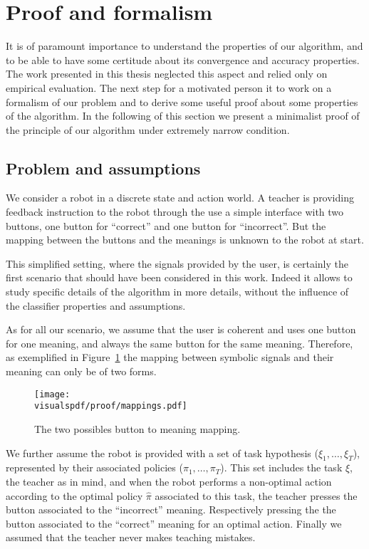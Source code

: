
\section{Proof and formalism}
\label{chapter:limitations:proof}

It is of paramount importance to understand the properties of our algorithm, and to be able to have some certitude about its convergence and accuracy properties. The work presented in this thesis neglected this aspect and relied only on empirical evaluation. The next step for a motivated person it to work on a formalism of our problem and to derive some useful proof about some properties of the algorithm. In the following of this section we present a minimalist proof of the principle of our algorithm under extremely narrow condition.

\subsection{Problem and assumptions}

We consider a robot in a discrete state and action world. A teacher is providing feedback instruction to the robot through the use a simple interface with two buttons, one button for ``correct'' and one button for ``incorrect''. But the mapping between the buttons and the meanings is unknown to the robot at start.

This simplified setting, where the signals provided by the user, is certainly the first scenario that should have been considered in this work. Indeed it allows to study specific details of the algorithm in more details, without the influence of the classifier properties and  assumptions.

As for all our scenario, we assume that the user is coherent and uses one button for one meaning, and always the same button for the same meaning. Therefore, as exemplified in Figure~\ref{fig:proofmapping} the mapping between symbolic signals and their meaning can only be of two forms. 

\begin{figure}[!ht]
\centering
\texttt{[image: \\visualspdf/proof/mappings.pdf]}
\caption{The two possibles button to meaning mapping.}
\label{fig:proofmapping}
\end{figure} 

We further assume the robot is provided with a set of task hypothesis ($\xi_1,\ldots,\xi_T$), represented by their associated policies ($\pi_1, \ldots, \pi_T$). This set includes the task $\hat{\xi}$, the teacher as in mind, and when the robot performs a non-optimal action according to the optimal policy $\hat{\pi}$ associated to this task, the teacher presses the button associated to the ``incorrect'' meaning. Respectively pressing the  the button associated to the ``correct'' meaning for an optimal action. Finally we assumed that the teacher never makes teaching mistakes.

